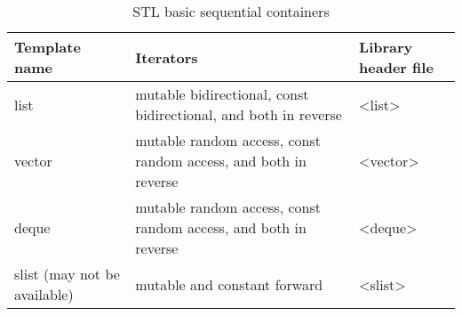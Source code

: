 \begin{table}[H]
\begin{center}
\renewcommand{\arraystretch}{1.8}
\begin{tabular}{ m{3cm} m{8cm} m{3cm}} 
\textbf{Template name} & \textbf{Iterators} & \textbf{Library header file}\\
\hline

list & mutable bidirectional, const bidirectional, and both in reverse
& \textless list\textgreater\\
\hline

vector & mutable random access, const random access, and both in reverse
& \textless vector\textgreater\\
\hline

deque & mutable random access, const random access, and both in reverse
& \textless deque\textgreater\\
\hline

slist (may not be available) & mutable and constant forward
& \textless slist\textgreater\\
\hline
\end{tabular}
\end{center}
\caption{STL basic sequential containers}
\label{table_1}
\end{table}



